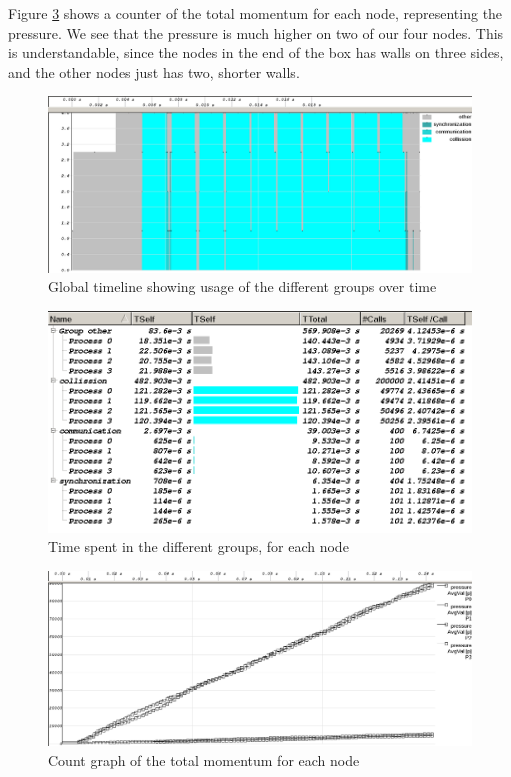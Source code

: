 \documentclass[a4paper]{article}
\begin{document}
Figure \ref{count} shows a counter of the total momentum for each node,
representing the pressure. We see that the pressure is much higher on
two of our four nodes. This is understandable, since the nodes in the
end of the box has walls on three sides, and the other nodes just has
two, shorter walls.\\

\begin{figure}[H]
  \centering
  \includegraphics[scale=0.3]{global_timeline.png}
  \caption{Global timeline showing usage of the different groups over time}
  \label{timeline}
\end{figure}

\begin{figure}[H]
  \centering
  \includegraphics[scale=0.5]{group_times.png}
  \caption{Time spent in the different groups, for each node}
  \label{time}
\end{figure}

\begin{figure}[H]
  \centering
  \includegraphics[scale=0.3]{count.png}
  \caption{Count graph of the total momentum for each node}
  \label{count}
\end{figure}
\end{document}

